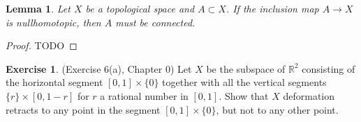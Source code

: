 \documentclass[12pt, psamsfonts]{amsart}
\newtheorem{lem}[thm]{Lemma}
\theoremstyle{definition}
\newtheorem{exer}[thm]{Exercise}
\theoremstyle{remark}
\numberwithin{equation}{section}
\begin{document}
\begin{lem}
  Let $X$ be a topological space and $A \subset X$.
  If the inclusion map $A \rightarrow X$ is nullhomotopic, then $A$ must be connected.
\end{lem}

\begin{proof}
  TODO
\end{proof}

\begin{exer}{(Exercise 6(a), Chapter 0)}
  Let $X$ be the subspace of $\mathbb{R}^2$ consisting of the horizontal segment $[0, 1] \times \{ 0 \}$ together with all the vertical segments $\{ r \} \times [0, 1 - r]$ for $r$ a rational number in $[0, 1]$.
  Show that $X$ deformation retracts to any point in the segment $[0, 1] \times \{ 0 \}$, but not to any other point.
\end{exer}
\end{document}
